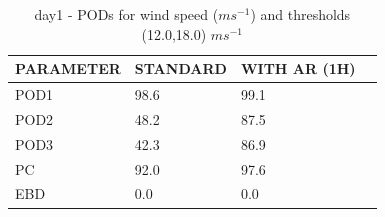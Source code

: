\begin{table}[h!]
\begin{center}
\begin{tabular}{|l|l|l|l|}
\hline
\multicolumn{1}{|c|}{\cellcolor[HTML]{C0C0C0}\textbf{PARAMETER}} & \multicolumn{1}{c|}{\cellcolor[HTML]{C0C0C0}\textbf{STANDARD}} & \multicolumn{1}{c|}{\cellcolor[HTML]{C0C0C0}\textbf{WITH AR (1H)}} \\
\hline
\cellcolor[HTML]{C0C0C0}POD1  & 98.6   & 99.1         \\
\cellcolor[HTML]{C0C0C0}POD2  & 48.2   & 87.5         \\
\cellcolor[HTML]{C0C0C0}POD3  & 42.3   & 86.9         \\
\cellcolor[HTML]{C0C0C0}PC    & 92.0     & 97.6           \\
\cellcolor[HTML]{C0C0C0}EBD   & 0.0    & 0.0          \\
\hline
\end{tabular}
\caption{day1 - PODs for wind speed ($m s^{-1}$) and thresholds (12.0,18.0) $m s^{-1}$}
\label{tab:podwsFT:day1}
\end{center}
\end{table}
